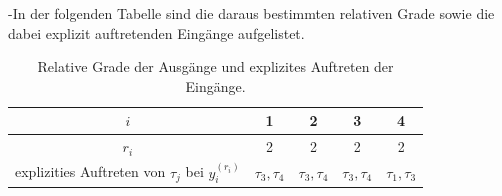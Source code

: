 -In der folgenden Tabelle sind die daraus bestimmten relativen Grade sowie die dabei explizit auftretenden Eingänge aufgelistet.

\begin{table}[htbp]%
	\centering
	\caption{Relative Grade der Ausgänge und explizites Auftreten der Eingänge.}
	\label{tab:relative_degrees}
	\begin{tabular}{c| c c c c} 
		$i$ & 1 & 2 & 3 & 4 \\ 
		\hline
		$r_i$ & 2 & 2 & 2 & 2\\ 
		\hline
		explizities Auftreten von $\tau_j$ bei $y_i^{(r_i)}$ & $\tau_3, \tau_4$ & $\tau_3, \tau_4$ & $\tau_3, \tau_4$ & $\tau_1, \tau_3$ \\ 
		\bottomrule
	\end{tabular}
\end{table}

